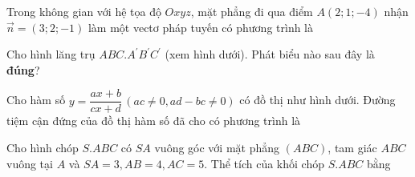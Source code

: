 \documentclass{exam}
\begin{document}
\begin{question}
Trong không gian với hệ tọa độ $Oxyz$, mặt phẳng đi qua điểm $A(2; 1;-4)$ nhận $\vec{n}=(3; 2;-1)$ làm một vectơ pháp tuyến có phương trình là






\end{question}





\begin{question}
Cho hình lăng trụ $ABC.A^{\prime}B^{\prime}C^{\prime}$ (xem hình dưới). Phát biểu nào sau đây là \textbf{đúng}?

\begin{center}\end{center}






\end{question}





\begin{question}
Cho hàm số $y=\dfrac{ax+b}{cx+d}\,(ac \neq 0, ad-bc \neq 0)$ có đồ thị như hình dưới. Đường tiệm cận đứng của đồ thị hàm số đã cho có phương trình là

\begin{center}\end{center}






\end{question}





\begin{question}
Cho hình chóp $S.ABC$ có $SA$ vuông góc với mặt phẳng $(ABC)$, tam giác $ABC$ vuông tại $A$ và $SA=3, AB=4, AC=5$. Thể tích của khối chóp $S.ABC$ bằng






\end{question}
\end{document}
